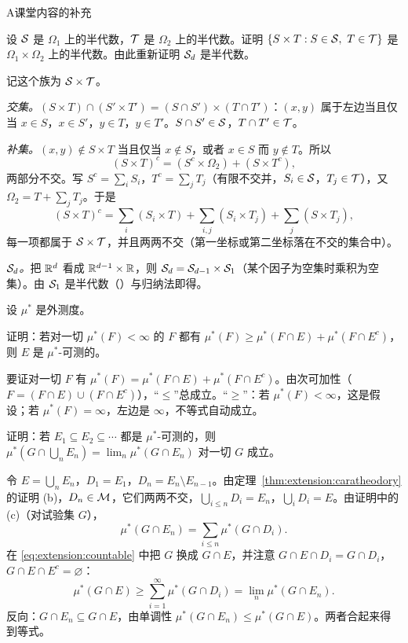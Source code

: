 \begin{exercises}{A}{课堂内容的补充}
\item\label{ex:extension:A1} 设 $\mathcal{S}$ 是 $\Omega_1$ 上的半代数，$\mathcal{T}$ 是 $\Omega_2$ 上的半代数。证明 $\{S\times T: S\in\cS,\ T\in\cT\}$ 是 $\Omega_1\times\Omega_2$ 上的半代数。由此重新证明 $\mathcal{S}_d$ 是半代数。
\begin{solution}
记这个族为 $\mathcal{S}\times\mathcal{T}$。

\emph{交集。}$(S\times T)\cap(S'\times T')=(S\cap S')\times(T\cap T')$：$(x,y)$ 属于左边当且仅当 $x\in S$，$x\in S'$，$y\in T$，$y\in T'$。$S\cap S'\in\mathcal{S}$，$T\cap T'\in\mathcal{T}$。

\emph{补集。}$(x,y)\notin S\times T$ 当且仅当 $x\notin S$，或者 $x\in S$ 而 $y\notin T$。所以
\[
(S\times T)^c=(S^c\times\Omega_2)+(S\times T^c),
\]
两部分不交。写 $S^c=\sum_iS_i$，$T^c=\sum_jT_j$（有限不交并，$S_i\in\mathcal{S}$，$T_j\in\mathcal{T}$），又 $\Omega_2=T+\sum_jT_j$。于是
\[
(S\times T)^c=\sum_i(S_i\times T)+\sum_{i,j}(S_i\times T_j)+\sum_j(S\times T_j),
\]
每一项都属于 $\mathcal{S}\times\mathcal{T}$，并且两两不交（第一坐标或第二坐标落在不交的集合中）。

\emph{$\mathcal{S}_d$。}把 $\mathbb{R}^d$ 看成 $\mathbb{R}^{d-1}\times\mathbb{R}$，则 $\mathcal{S}_d=\mathcal{S}_{d-1}\times\mathcal{S}_1$（某个因子为空集时乘积为空集）。由 $\mathcal{S}_1$ 是半代数（）与归纳法即得。
\end{solution}

\item\label{ex:extension:A2} 设 $\mu^*$ 是外测度。
\begin{questions}
\item 证明：若对一切 $\mu^*(F)<\infty$ 的 $F$ 都有 $\mu^*(F)\geqslant\mu^*(F\cap E)+\mu^*(F\cap E^c)$，则 $E$ 是 $\mu^*$-可测的。
\begin{solution}
要证对一切 $F$ 有 $\mu^*(F)=\mu^*(F\cap E)+\mu^*(F\cap E^c)$。由次可加性（$F=(F\cap E)\cup(F\cap E^c)$），“$\leqslant$”总成立。“$\geqslant$”：若 $\mu^*(F)<\infty$，这是假设；若 $\mu^*(F)=\infty$，左边是 $\infty$，不等式自动成立。
\end{solution}
\item 证明：若 $E_1\subseteq E_2\subseteq\cdots$ 都是 $\mu^*$-可测的，则 $\mu^*(G\cap\bigcup_nE_n)=\lim_n\mu^*(G\cap E_n)$ 对一切 $G$ 成立。
\begin{solution}
令 $E=\bigcup_nE_n$，$D_1=E_1$，$D_n=E_n\setminus E_{n-1}$。由定理~\ref{thm:extension:caratheodory} 的证明 (b)，$D_n\in\mathcal{M}$，它们两两不交，$\bigcup_{i\leqslant n}D_i=E_n$，$\bigcup_iD_i=E$。由证明中的 (c)（对试验集 $G$），
\[
\mu^*(G\cap E_n)=\sum_{i\leqslant n}\mu^*(G\cap D_i).
\]
在 \eqref{eq:extension:countable} 中把 $G$ 换成 $G\cap E$，并注意 $G\cap E\cap D_i=G\cap D_i$，$G\cap E\cap E^c=\varnothing$：
\[
\mu^*(G\cap E)\geqslant\sum_{i=1}^\infty\mu^*(G\cap D_i)=\lim_n\mu^*(G\cap E_n).
\]
反向：$G\cap E_n\subseteq G\cap E$，由单调性 $\mu^*(G\cap E_n)\leqslant\mu^*(G\cap E)$。两者合起来得到等式。


\end{solution}
\end{questions}
\end{exercises}
